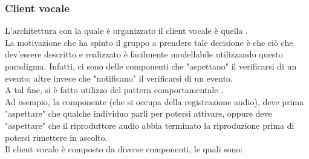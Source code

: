 \subsubsection{Client vocale}
L'architettura con la quale è organizzato il client vocale è quella .\\
La motivazione che ha spinto il gruppo a prendere tale decisione è che ciò che dev'essere descritto e realizzato è facilmente modellabile utilizzando questo paradigma. Infatti, ci sono delle componenti che "aspettano" il verificarsi di un evento; altre invece che "notificano"  il verificarsi di un evento.\\
A tal fine, si è fatto utilizzo del pattern comportamentale .\\
Ad esempio, la componente  (che si occupa della registrazione audio), deve prima "aspettare" che qualche individuo parli per potersi attivare, oppure deve "aspettare" che il riproduttore audio abbia terminato la riproduzione prima di potersi rimettere in ascolto.\\
Il client vocale è composto da diverse componenti, le quali sono:
